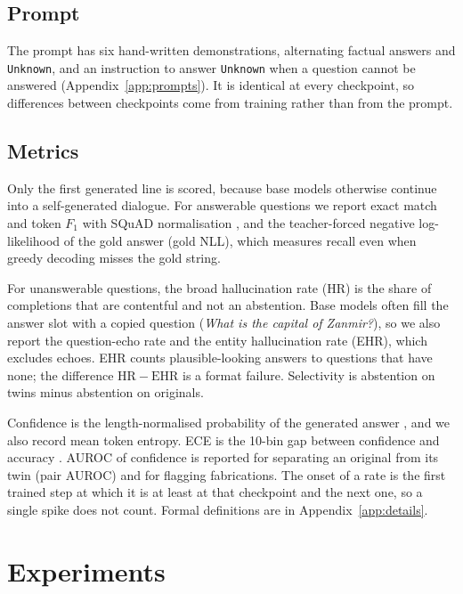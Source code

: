 \documentclass[11pt]{article}
\begin{document}
\subsection{Prompt}
\label{sec:prompt}

The prompt has six hand-written demonstrations, alternating factual answers and \texttt{Unknown}, and an instruction to answer \texttt{Unknown} when a question cannot be answered (Appendix~\ref{app:prompts}). It is identical at every checkpoint, so differences between checkpoints come from training rather than from the prompt.

\subsection{Metrics}
\label{sec:metrics}

Only the first generated line is scored, because base models otherwise continue into a self-generated dialogue. For answerable questions we report exact match and token $F_1$ with SQuAD normalisation \citep{rajpurkar2016squad}, and the teacher-forced negative log-likelihood of the gold answer (gold NLL), which measures recall even when greedy decoding misses the gold string.

For unanswerable questions, the broad hallucination rate (HR) is the share of completions that are contentful and not an abstention. Base models often fill the answer slot with a copied question (\emph{What is the capital of Zanmir?}), so we also report the question-echo rate and the entity hallucination rate (EHR), which excludes echoes. EHR counts plausible-looking answers to questions that have none; the difference $\mathrm{HR}-\mathrm{EHR}$ is a format failure. Selectivity is abstention on twins minus abstention on originals.

Confidence is the length-normalised probability of the generated answer \citep{kadavath2022know}, and we also record mean token entropy. ECE is the 10-bin gap between confidence and accuracy \citep{naeini2015ece,guo2017calibration}. AUROC of confidence is reported for separating an original from its twin (pair AUROC) and for flagging fabrications. The onset of a rate is the first trained step at which it is at least \resOnsetThreshold{} at that checkpoint and the next one, so a single spike does not count. Formal definitions are in Appendix~\ref{app:details}.

\section{Experiments}
\end{document}
